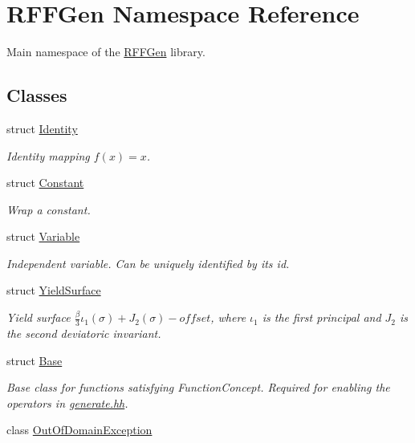 \hypertarget{namespaceRFFGen}{\section{R\-F\-F\-Gen Namespace Reference}
\label{namespaceRFFGen}
}


Main namespace of the \hyperlink{namespaceRFFGen}{R\-F\-F\-Gen} library.  


\subsection*{Classes}
\begin{DoxyCompactItemize}
\item 
struct \hyperlink{structRFFGen_1_1Identity}{Identity}
\begin{DoxyCompactList}\small\item\em Identity mapping $ f(x)=x $. \end{DoxyCompactList}\item 
struct \hyperlink{structRFFGen_1_1Constant}{Constant}
\begin{DoxyCompactList}\small\item\em Wrap a constant. \end{DoxyCompactList}\item 
struct \hyperlink{structRFFGen_1_1Variable}{Variable}
\begin{DoxyCompactList}\small\item\em Independent variable. Can be uniquely identified by its id. \end{DoxyCompactList}\item 
struct \hyperlink{structRFFGen_1_1YieldSurface}{Yield\-Surface}
\begin{DoxyCompactList}\small\item\em Yield surface $ \frac{\beta}{3}\iota_1(\sigma) + J_2(\sigma)-offset $, where $\iota_1$ is the first principal and $J_2$ is the second deviatoric invariant. \end{DoxyCompactList}\item 
struct \hyperlink{structRFFGen_1_1Base}{Base}
\begin{DoxyCompactList}\small\item\em Base class for functions satisfying Function\-Concept. Required for enabling the operators in \hyperlink{generate_8hh_source}{generate.\-hh}. \end{DoxyCompactList}\item 
class \hyperlink{classRFFGen_1_1OutOfDomainException}{Out\-Of\-Domain\-Exception}

\end{DoxyCompactItemize}
